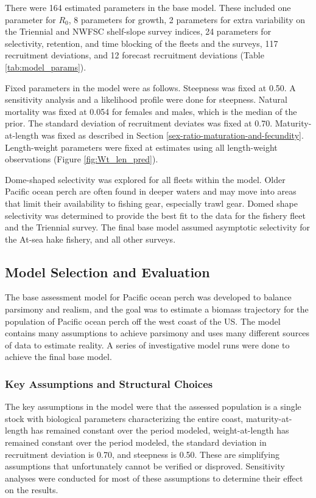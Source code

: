 \documentclass[12pt,]{article}
\begin{document}
There were 164 estimated parameters in the base model. These included
one parameter for \(R_0\), 8 parameters for growth, 2 parameters for
extra variability on the Triennial and NWFSC shelf-slope survey indices,
24 parameters for selectivity, retention, and time blocking of the
fleets and the surveys, 117 recruitment deviations, and 12 forecast
recruitment deviations (Table \ref{tab:model_params}).

Fixed parameters in the model were as follows. Steepness was fixed at
0.50. A sensitivity analysis and a likelihood profile were done for
steepness. Natural mortality was fixed at 0.054 for females and males,
which is the median of the prior. The standard deviation of recruitment
deviates was fixed at 0.70. Maturity-at-length was fixed as described in
Section \ref{sex-ratio-maturation-and-fecundity}. Length-weight
parameters were fixed at estimates using all length-weight observations
(Figure \ref{fig:Wt_len_pred}).

Dome-shaped selectivity was explored for all fleets within the model.
Older Pacific ocean perch are often found in deeper waters and may move
into areas that limit their availability to fishing gear, especially
trawl gear. Domed shape selectivity was determined to provide the best
fit to the data for the fishery fleet and the Triennial survey. The
final base model assumed asymptotic selectivity for the At-sea hake
fishery, and all other surveys.

\subsection{Model Selection and
Evaluation}\label{model-selection-and-evaluation}

The base assessment model for Pacific ocean perch was developed to
balance parsimony and realism, and the goal was to estimate a biomass
trajectory for the population of Pacific ocean perch off the west coast
of the US. The model contains many assumptions to achieve parsimony and
uses many different sources of data to estimate reality. A series of
investigative model runs were done to achieve the final base model.

\subsubsection{Key Assumptions and Structural
Choices}\label{key-assumptions-and-structural-choices}

The key assumptions in the model were that the assessed population is a
single stock with biological parameters characterizing the entire coast,
maturity-at-length has remained constant over the period modeled,
weight-at-length has remained constant over the period modeled, the
standard deviation in recruitment deviation is 0.70, and steepness is
0.50. These are simplifying assumptions that unfortunately cannot be
verified or disproved. Sensitivity analyses were conducted for most of
these assumptions to determine their effect on the results.
\end{document}
